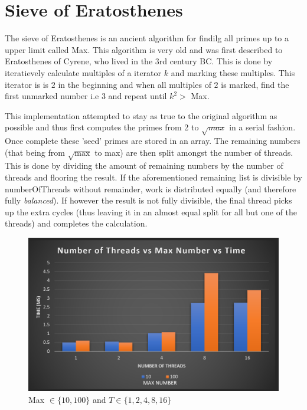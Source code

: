 \section{Sieve of Eratosthenes}

The sieve of Eratosthenes is an ancient algorithm for findilg all primes up to a
upper limit called Max. This algorithm is very old and was first described to 
Eratosthenes of Cyrene, who lived in the 3rd century BC. 
\cite{eratosthenes} 
This is done by iteratievely calculate multiples of a 
iterator $k$ and marking these multiples. This iterator is is $2$ in the beginning
and when all multiples of $2$ is marked, find the first unmarked number i.e $3$
and repeat until $k^2 >$ Max.

This implementation attempted to stay as true to the original algorithm as 
possible and thus first computes the primes from 2 to $\sqrt{max}$ in a serial 
fashion. Once complete these 'seed' primes are stored in an array.
The remaining numbers (that being from $\sqrt{\text{max}}$ to max) are then 
split amongst the number of threads. This is done by dividing the amount of 
remaining numbers by the number of threads and flooring the result. If the 
aforementioned remaining list is divisible by numberOfThreads without remainder, 
work is distributed equally (and therefore fully \textit{balanced}). If however the 
result is not fully divisible, the final thread picks up the extra cycles 
(thus leaving it in an almost equal split for all but one of the threads) and 
completes the calculation. 

\begin{figure}
    \centering
    \includegraphics[width=\linewidth]{Figures/maxNumLow.png}
    \caption{Max $\in \{10, 100\}$ and $T \in \{1, 2, 4, 8, 16\}$}
    \label{fig:maxnumlow}
\end{figure}

